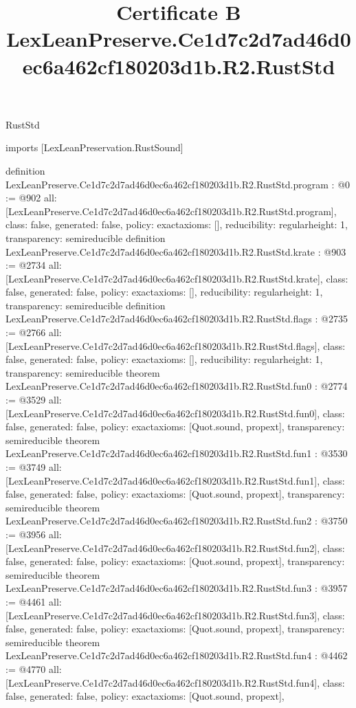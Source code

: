\begin{lexlean}{RustStd}
\title{Certificate B LexLeanPreserve.Ce1d7c2d7ad46d0ec6a462cf180203d1b.R2.RustStd}
\begin{coremodule}
imports [LexLeanPreservation.RustSound]

definition LexLeanPreserve.Ce1d7c2d7ad46d0ec6a462cf180203d1b.R2.RustStd.program : @0 := @902 {
  all: [LexLeanPreserve.Ce1d7c2d7ad46d0ec6a462cf180203d1b.R2.RustStd.program],
  class: false,
  generated: false,
  policy: exact{axioms: []},
  reducibility: regular{height: 1},
  transparency: semireducible
}
definition LexLeanPreserve.Ce1d7c2d7ad46d0ec6a462cf180203d1b.R2.RustStd.krate : @903 := @2734 {
  all: [LexLeanPreserve.Ce1d7c2d7ad46d0ec6a462cf180203d1b.R2.RustStd.krate],
  class: false,
  generated: false,
  policy: exact{axioms: []},
  reducibility: regular{height: 1},
  transparency: semireducible
}
definition LexLeanPreserve.Ce1d7c2d7ad46d0ec6a462cf180203d1b.R2.RustStd.flags : @2735 := @2766 {
  all: [LexLeanPreserve.Ce1d7c2d7ad46d0ec6a462cf180203d1b.R2.RustStd.flags],
  class: false,
  generated: false,
  policy: exact{axioms: []},
  reducibility: regular{height: 1},
  transparency: semireducible
}
theorem LexLeanPreserve.Ce1d7c2d7ad46d0ec6a462cf180203d1b.R2.RustStd.fun0 : @2774 := @3529 {
  all: [LexLeanPreserve.Ce1d7c2d7ad46d0ec6a462cf180203d1b.R2.RustStd.fun0],
  class: false,
  generated: false,
  policy: exact{axioms: [Quot.sound, propext]},
  transparency: semireducible
}
theorem LexLeanPreserve.Ce1d7c2d7ad46d0ec6a462cf180203d1b.R2.RustStd.fun1 : @3530 := @3749 {
  all: [LexLeanPreserve.Ce1d7c2d7ad46d0ec6a462cf180203d1b.R2.RustStd.fun1],
  class: false,
  generated: false,
  policy: exact{axioms: [Quot.sound, propext]},
  transparency: semireducible
}
theorem LexLeanPreserve.Ce1d7c2d7ad46d0ec6a462cf180203d1b.R2.RustStd.fun2 : @3750 := @3956 {
  all: [LexLeanPreserve.Ce1d7c2d7ad46d0ec6a462cf180203d1b.R2.RustStd.fun2],
  class: false,
  generated: false,
  policy: exact{axioms: [Quot.sound, propext]},
  transparency: semireducible
}
theorem LexLeanPreserve.Ce1d7c2d7ad46d0ec6a462cf180203d1b.R2.RustStd.fun3 : @3957 := @4461 {
  all: [LexLeanPreserve.Ce1d7c2d7ad46d0ec6a462cf180203d1b.R2.RustStd.fun3],
  class: false,
  generated: false,
  policy: exact{axioms: [Quot.sound, propext]},
  transparency: semireducible
}
theorem LexLeanPreserve.Ce1d7c2d7ad46d0ec6a462cf180203d1b.R2.RustStd.fun4 : @4462 := @4770 {
  all: [LexLeanPreserve.Ce1d7c2d7ad46d0ec6a462cf180203d1b.R2.RustStd.fun4],
  class: false,
  generated: false,
  policy: exact{axioms: [Quot.sound, propext]},
}
\end{coremodule}
\end{lexlean}
